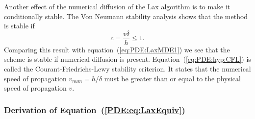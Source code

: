 Another effect of the numerical diffusion of the Lax algorithm is to
make it conditionally stable.  The Von Neumann stability analysis
shows that the method is stable if
%
\begin{equation}
  c = \frac{v \delta}{h} \le 1 .
  \label{eq:PDE:hyp:CFL}
\end{equation}
%
Comparing this result with equation~(\ref{eq:PDE:LaxMDE1}) we see that
the scheme is stable if numerical diffusion is present.
Equation~(\ref{eq:PDE:hyp:CFL}) is called the Courant-Friedrichs-Lewy
stability criterion.  It states that the numerical speed of
propagation $v_{num} = h/ \delta$ must be greater than or equal to the
physical speed of propagation $v$.

\subsubsection{Derivation of Equation~(\ref{PDE:eq:LaxEquiv})}

